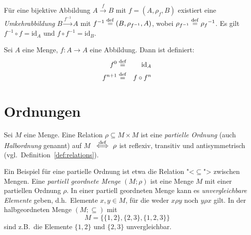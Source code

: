 \begin{lemma} Für eine bijektive Abbildung $A \stackrel{f}{\longrightarrow} B$
   mit $f =(A, \rho_f,B)$ existiert eine \emph{Umkehrabbildung}
   $B \stackrel{f^{-1}}{\longrightarrow} A$ mit $f^{-1} \stackrel{\rm def}{=} (B,\rho_{f^{-1}},A)$,
   wobei $\rho_{f^{-1}} \stackrel{\rm def}{=} {\rho_f}^{-1}$. Es gilt $f^{-1} \circ f = \textrm{id}_A$
   und $f \circ f^{-1} = \textrm{id}_B$.
\end{lemma}

\begin{definition}
  \label{def:power_fun}
  Sei $A$ eine Menge, 
  $f:A\rightarrow A$ eine Abbildung.  Dann ist definiert:
  \begin{eqnarray*}
    f^0 &\stackrel{\rm def}{=}& \textrm{id}_A\\
    f^{n+1} &\stackrel{\rm def}{=}& f\circ f^n
  \end{eqnarray*}
\end{definition}

\section{Ordnungen}
\label{sec:halbordnungen}

\begin{definition}
   Sei $M$ eine Menge. Eine Relation $\rho \subseteq M \times M$ ist eine
   \textit{partielle Ordnung}
   (auch
   \textit{Halb\-ord\-nung} genannt)
 auf $M$ \ $\stackrel{\rm def}{\Longleftrightarrow} \ \rho$ ist
   reflexiv, transitiv und antisymmetrisch (vgl.\ Definition~\ref{def:relations}).
\end{definition}

Ein Beispiel für eine partielle Ordnung ist etwa die Relation "<$\subseteq$"> zwischen 
Mengen. Eine \emph{partiell geordnete Menge} $(M;\rho)$ 
ist eine Menge $M$ mit einer
partiellen Ordnung $\rho$. In einer 
partiell ge\-ord\-ne\-ten Menge kann es
\emph{unvergleichbare Elemente} geben, d.h.\ Elemente $x,y \in M$, für die weder
$x \rho y$ noch $y \rho x$ gilt. In der halbgeordneten Menge $(M;\subseteq)$ mit
\[ M = \{\{1,2\},\{2,3\},\{1,2,3\}\} \]
sind z.B.\ die Elemente $\{1,2\}$ und $\{2,3\}$ unvergleichbar. 

